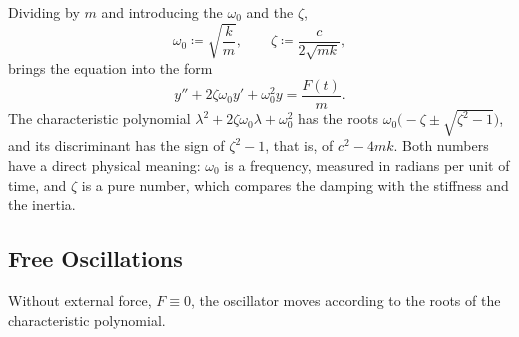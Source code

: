 \begin{table}
\end{table}

Dividing by $m$ and introducing the  $\omega_0$ and the  $\zeta$,
\[
\omega_0\coloneqq\sqrt{\frac km},\qquad\zeta\coloneqq\frac c{2\sqrt{mk}},
\]
brings the equation into the form
\begin{equation}
y''+2\zeta\omega_0y'+\omega_0^2y=\frac{F(t)}m .
\label{eq:oscillator-normalised}
\end{equation}
The characteristic polynomial $\lambda^2+2\zeta\omega_0\lambda+\omega_0^2$ has the roots $\omega_0\bigl(-\zeta\pm\sqrt{\zeta^2-1}\bigr)$, and its discriminant has the sign of $\zeta^2-1$, that is, of $c^2-4mk$. Both numbers have a direct physical meaning: $\omega_0$ is a frequency, measured in radians per unit of time, and $\zeta$ is a pure number, which compares the damping with the stiffness and the inertia.

\subsection{Free Oscillations}

Without external force, $F\equiv0$, the oscillator moves according to the roots of the characteristic polynomial.

